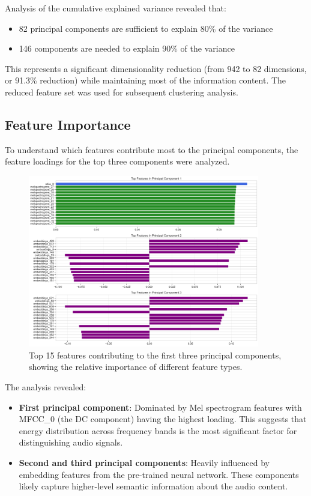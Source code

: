 \documentclass{article}
\begin{document}
Analysis of the cumulative explained variance revealed that:
\begin{itemize}
    \item 82 principal components are sufficient to explain 80\% of the variance
    \item 146 components are needed to explain 90\% of the variance
\end{itemize}

This represents a significant dimensionality reduction (from 942 to 82 dimensions, or 91.3\% reduction) while maintaining most of the information content. The reduced feature set was used for subsequent clustering analysis.

\subsection{Feature Importance}

To understand which features contribute most to the principal components, the feature loadings for the top three components were analyzed.

\begin{figure}[H]
  \centering
  \includegraphics[width=0.9\textwidth]{figures/audio_features/feature_importance.png}
  \caption{Top 15 features contributing to the first three principal components, showing the relative importance of different feature types.}
  \label{fig:feature_importance}
\end{figure}

The analysis revealed:
\begin{itemize}
    \item \textbf{First principal component}: Dominated by Mel spectrogram features with MFCC\_0 (the DC component) having the highest loading. This suggests that energy distribution across frequency bands is the most significant factor for distinguishing audio signals.
    
    \item \textbf{Second and third principal components}: Heavily influenced by embedding features from the pre-trained neural network. These components likely capture higher-level semantic information about the audio content.
\end{itemize}
\end{document}

